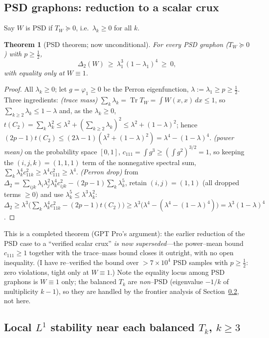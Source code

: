\documentclass[11pt]{article}
\newtheorem{theorem}{Theorem}[section]
\theoremstyle{definition}
\newcommand{\Tr}{\operatorname{Tr}}
\newcommand{\tw}{T_W}
\newcommand{\Tk}{T_k}
\begin{document}
\subsection{PSD graphons: reduction to a scalar crux}\label{sec:psd}

Say $W$ is PSD if $\tw\succeq0$, i.e.\ $\lambda_k\ge0$ for all $k$.

\begin{theorem}[PSD theorem; now unconditional]\label{prop:psd}
For every PSD graphon ($\tw\succeq0$) with $p\ge\tfrac12$,
\[
  \Delta_2(W)\ \ge\ \lambda_1^3\,(1-\lambda_1)^4\ \ge\ 0,
\]
with equality only at $W\equiv1$.
\end{theorem}
\begin{proof}
All $\lambda_k\ge0$; let $g=\varphi_1\ge0$ be the Perron eigenfunction,
$\lambda:=\lambda_1\ge p\ge\tfrac12$.  Three ingredients:
\emph{(trace mass)} $\sum_k\lambda_k=\Tr\tw=\int W(x,x)\,dx\le1$, so
$\sum_{k\ge2}\lambda_k\le1-\lambda$ and, as the $\lambda_k\ge0$,
$t(C_2)=\sum_k\lambda_k^2\le\lambda^2+(\sum_{k\ge2}\lambda_k)^2\le\lambda^2+(1-\lambda)^2$;
hence $(2p-1)t(C_2)\le(2\lambda-1)(\lambda^2+(1-\lambda)^2)=\lambda^4-(1-\lambda)^4$.
\emph{(power mean)} on the probability space $[0,1]$, $c_{111}=\int g^3\ge
(\int g^2)^{3/2}=1$, so keeping the $(i,j,k)=(1,1,1)$ term of the nonnegative
spectral sum, $\sum_k\lambda_k^4 c_{11k}^2\ge\lambda^4 c_{111}^2\ge\lambda^4$.
\emph{(Perron drop)} from $\Delta_2=\sum_{ijk}\lambda_i\lambda_j^2\lambda_k^4c_{ijk}^2
-(2p-1)\sum_k\lambda_k^5$, retain $(i,j)=(1,1)$ (all dropped terms $\ge0$) and use
$\lambda_k^5\le\lambda^3\lambda_k^2$:
$\Delta_2\ge\lambda^3\big(\sum_k\lambda_k^4c_{11k}^2-(2p-1)t(C_2)\big)
\ge\lambda^3\big(\lambda^4-(\lambda^4-(1-\lambda)^4)\big)=\lambda^3(1-\lambda)^4$.
\end{proof}

This is a completed theorem (GPT Pro's argument): the earlier reduction of the PSD
case to a ``verified scalar crux'' \emph{is now superseded}---the power--mean bound
$c_{111}\ge1$ together with the trace--mass bound closes it outright, with no open
inequality.  (I have re--verified the bound over $>7\times10^4$ PSD samples with
$p\ge\tfrac12$: zero violations, tight only at $W\equiv1$.)  Note the equality
locus among PSD graphons is $W\equiv1$ only; the balanced $\Tk$ are \emph{non}--PSD
(eigenvalue $-1/k$ of multiplicity $k-1$), so they are handled by the frontier
analysis of Section~\ref{sec:local}, not here.

\subsection{Local $L^1$ stability near each balanced $\Tk$, $k\ge3$}\label{sec:local}
\end{document}
